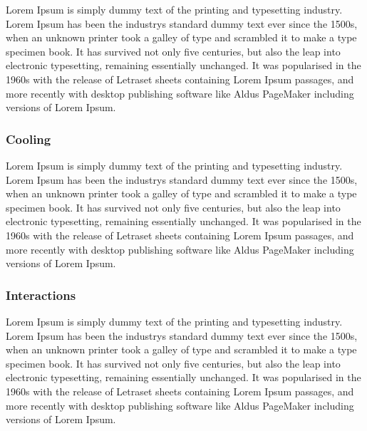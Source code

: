  Lorem Ipsum is simply dummy text of the printing and typesetting industry. Lorem Ipsum has been the industry\textquotesingle{}s standard dummy text ever since the 1500s, when an unknown printer took a galley of type and scrambled it to make a type specimen book. It has survived not only five centuries, but also the leap into electronic typesetting, remaining essentially unchanged. It was popularised in the 1960s with the release of Letraset sheets containing Lorem Ipsum passages, and more recently with desktop publishing software like Aldus Page\+Maker including versions of Lorem Ipsum.

 

\subsubsection*{Cooling}

 Lorem Ipsum is simply dummy text of the printing and typesetting industry. Lorem Ipsum has been the industry\textquotesingle{}s standard dummy text ever since the 1500s, when an unknown printer took a galley of type and scrambled it to make a type specimen book. It has survived not only five centuries, but also the leap into electronic typesetting, remaining essentially unchanged. It was popularised in the 1960s with the release of Letraset sheets containing Lorem Ipsum passages, and more recently with desktop publishing software like Aldus Page\+Maker including versions of Lorem Ipsum.

 

\subsubsection*{Interactions}

 Lorem Ipsum is simply dummy text of the printing and typesetting industry. Lorem Ipsum has been the industry\textquotesingle{}s standard dummy text ever since the 1500s, when an unknown printer took a galley of type and scrambled it to make a type specimen book. It has survived not only five centuries, but also the leap into electronic typesetting, remaining essentially unchanged. It was popularised in the 1960s with the release of Letraset sheets containing Lorem Ipsum passages, and more recently with desktop publishing software like Aldus Page\+Maker including versions of Lorem Ipsum. 